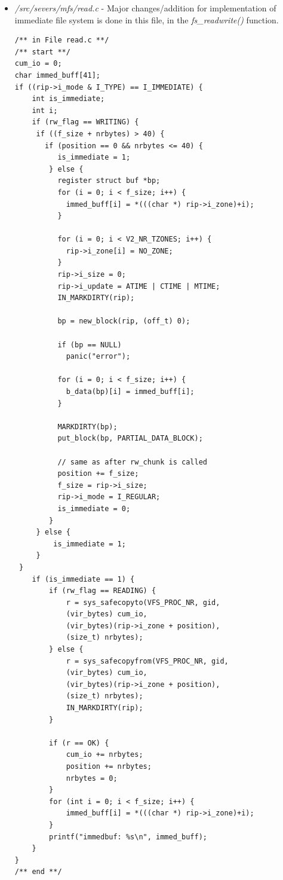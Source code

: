 \begin{itemize}
the inode. Few of the files are listed below:
	\begin{itemize}
	  \item \emph{/servers/vfs/select.c}
	  \item \emph{/servers/vfs/link.c}
	  \item \emph{/servers/vfs/read.c}
	  \item \emph{/commands/grep/mmfile.c} \ldots etc
	\end{itemize}
\item \emph{/src/severs/mfs/read.c} - Major changes/addition for implementation
of immediate file system is done in this file, in the \emph{fs\_readwrite()}
function.
\begin{lstlisting}
/** in File read.c **/
/** start **/
cum_io = 0;
char immed_buff[41];
if ((rip->i_mode & I_TYPE) == I_IMMEDIATE) {
	int is_immediate;
	int i;
	if (rw_flag == WRITING) {
	 if ((f_size + nrbytes) > 40) {
	   if (position == 0 && nrbytes <= 40) {
		  is_immediate = 1;
		} else {
		  register struct buf *bp;
		  for (i = 0; i < f_size; i++) {
		    immed_buff[i] = *(((char *) rip->i_zone)+i);
		  }

		  for (i = 0; i < V2_NR_TZONES; i++) {
		    rip->i_zone[i] = NO_ZONE;
		  }
		  rip->i_size = 0;
		  rip->i_update = ATIME | CTIME | MTIME;
		  IN_MARKDIRTY(rip);

		  bp = new_block(rip, (off_t) 0);

		  if (bp == NULL)
		    panic("error");

		  for (i = 0; i < f_size; i++) {
		    b_data(bp)[i] = immed_buff[i];
		  }

		  MARKDIRTY(bp);
		  put_block(bp, PARTIAL_DATA_BLOCK);

		  // same as after rw_chunk is called
		  position += f_size;
		  f_size = rip->i_size;
		  rip->i_mode = I_REGULAR;
		  is_immediate = 0;
		}
	 } else {
		 is_immediate = 1;
	 }
 }
	if (is_immediate == 1) {
		if (rw_flag == READING) {
			r = sys_safecopyto(VFS_PROC_NR, gid, 
			(vir_bytes) cum_io, 
			(vir_bytes)(rip->i_zone + position), 
			(size_t) nrbytes);
		} else {
			r = sys_safecopyfrom(VFS_PROC_NR, gid, 
			(vir_bytes) cum_io,
			(vir_bytes)(rip->i_zone + position), 
			(size_t) nrbytes);
			IN_MARKDIRTY(rip);
		}

		if (r == OK) {
			cum_io += nrbytes;
			position += nrbytes;
			nrbytes = 0;
		}
		for (int i = 0; i < f_size; i++) {
			immed_buff[i] = *(((char *) rip->i_zone)+i);
		}
		printf("immedbuf: %s\n", immed_buff);
	}
}
/** end **/
	  	
\end{lstlisting}   
\end{itemize} 
 




